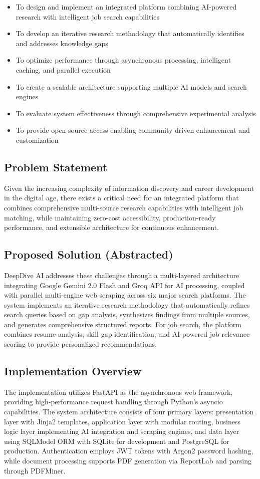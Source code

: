 \documentclass[conference]{IEEEtran}
\begin{document}
\begin{itemize}
    \item To design and implement an integrated platform combining AI-powered research with intelligent job search capabilities
    \item To develop an iterative research methodology that automatically identifies and addresses knowledge gaps
    \item To optimize performance through asynchronous processing, intelligent caching, and parallel execution
    \item To create a scalable architecture supporting multiple AI models and search engines
    \item To evaluate system effectiveness through comprehensive experimental analysis
    \item To provide open-source access enabling community-driven enhancement and customization
\end{itemize}

\subsection{Problem Statement}
Given the increasing complexity of information discovery and career development in the digital age, there exists a critical need for an integrated platform that combines comprehensive multi-source research capabilities with intelligent job matching, while maintaining zero-cost accessibility, production-ready performance, and extensible architecture for continuous enhancement.

\subsection{Proposed Solution (Abstracted)}
DeepDive AI addresses these challenges through a multi-layered architecture integrating Google Gemini 2.0 Flash and Groq API for AI processing, coupled with parallel multi-engine web scraping across six major search platforms. The system implements an iterative research methodology that automatically refines search queries based on gap analysis, synthesizes findings from multiple sources, and generates comprehensive structured reports. For job search, the platform combines resume analysis, skill gap identification, and AI-powered job relevance scoring to provide personalized recommendations.

\subsection{Implementation Overview}
The implementation utilizes FastAPI as the asynchronous web framework, providing high-performance request handling through Python's asyncio capabilities. The system architecture consists of four primary layers: presentation layer with Jinja2 templates, application layer with modular routing, business logic layer implementing AI integration and scraping engines, and data layer using SQLModel ORM with SQLite for development and PostgreSQL for production. Authentication employs JWT tokens with Argon2 password hashing, while document processing supports PDF generation via ReportLab and parsing through PDFMiner.
\end{document}
